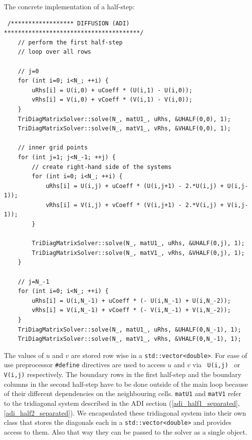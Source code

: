 \documentclass[11pt,a4paper]{article} %
\begin{document}
The concrete implementation of a half-step: 

\begin{center}
\begin{verbatim}
 /****************** DIFFUSION (ADI) ***************************************/ 
    // perform the first half-step
    // loop over all rows
    
    // j=0
    for (int i=0; i<N_; ++i) {
        uRhs[i] = U(i,0) + uCoeff * (U(i,1) - U(i,0));
        vRhs[i] = V(i,0) + vCoeff * (V(i,1) - V(i,0));
    }
    TriDiagMatrixSolver::solve(N_, matU1_, uRhs, &UHALF(0,0), 1);
    TriDiagMatrixSolver::solve(N_, matV1_, vRhs, &VHALF(0,0), 1);
    
    // inner grid points
    for (int j=1; j<N_-1; ++j) {
        // create right-hand side of the systems
        for (int i=0; i<N_; ++i) {
            uRhs[i] = U(i,j) + uCoeff * (U(i,j+1) - 2.*U(i,j) + U(i,j-1));
            vRhs[i] = V(i,j) + vCoeff * (V(i,j+1) - 2.*V(i,j) + V(i,j-1));
        }
        
        TriDiagMatrixSolver::solve(N_, matU1_, uRhs, &UHALF(0,j), 1);
        TriDiagMatrixSolver::solve(N_, matV1_, vRhs, &VHALF(0,j), 1);
    }
    
    // j=N_-1
    for (int i=0; i<N_; ++i) {
        uRhs[i] = U(i,N_-1) + uCoeff * (- U(i,N_-1) + U(i,N_-2));
        vRhs[i] = V(i,N_-1) + vCoeff * (- V(i,N_-1) + V(i,N_-2));
    }
    TriDiagMatrixSolver::solve(N_, matU1_, uRhs, &UHALF(0,N_-1), 1);
    TriDiagMatrixSolver::solve(N_, matV1_, vRhs, &VHALF(0,N_-1), 1);
\end{verbatim}
\end{center}

The values of $u$ and $v$ are stored row wise in a \texttt{std::vector<double>}.
For ease of use preprocessor \texttt{\#define} directives are used to access $u$ and $v$ via \texttt{ U(i,j) } or \texttt{ V(i,j)} respectively.
The boundary rows in the first half-step and the boundary columns in the second half-step have to be done outside of the main loop because of their different dependencies on the neighbouring cells.
\texttt{matU1} and \texttt{matV1} refer to the tridiagonal system described in the ADI section (\ref{adi_half1_separated}, \ref{adi_half2_separated}).
We encapsulated these tridiagonal system into their own class that stores the diagonals each in a \texttt{std::vector<double>} and provides access to them. Also that way they can be passed to the solver as a single object. 
\end{document}
